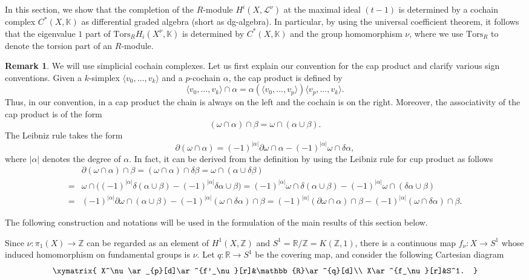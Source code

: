 \documentclass[12pt,leqno,twoside]{amsart}
\theoremstyle{plain}
\theoremstyle{definition}
\newtheorem{remark}[theorem]{Remark}
\newcommand{\R}{\mathbb{R}}
\newcommand{\Z}{\mathbb{Z}}
\newcommand{\K}{\mathbb{K}}
\newcommand{\Tors}{\mathrm{Tors}}
\newcommand{\sL}{\mathcal{L}}
\begin{document}
In this section, we show that  the completion of the $R$-module $H^i(X, \sL^\nu)$  at the maximal
ideal $(t-1)$  is determined by a cochain complex $C^*(X,\K)$ as differential graded algebra (short as dg-algebra).  In particular, by using the universal coefficient theorem, it follows that the eigenvalue $1$ part of $\Tors_R H_i(X^\nu,\K)$ is determined by $C^*(X,\K)$  and the group homomorphism $\nu$, where we use $\Tors_R$ to denote the torsion part of an $R$-module. 

\begin{remark}
We will use simplicial cochain complexes. Let us first explain our convention for the cap product and clarify various sign conventions. 
Given a $k$-simplex $\langle v_0, \ldots, v_k\rangle$ and a $p$-cochain $\alpha$, the cap product is defined by
\[
\langle v_0, \ldots, v_k\rangle\cap \alpha=\alpha(\langle v_0, \ldots, v_p\rangle) \langle v_p, \ldots, v_k\rangle.
\]
Thus, in our convention, in a cap product the chain is always on the left and the cochain is on the right. Moreover, the associativity of the cap product is of the form
\[
(\omega\cap \alpha)\cap \beta=\omega\cap(\alpha\cup \beta).
\]
The Leibniz rule takes the form 
\[
\partial(\omega\cap \alpha)=(-1)^{|\alpha|}\partial\omega\cap\alpha-(-1)^{|\alpha|}\omega\cap\delta\alpha , 
\]
where $|\alpha|$ denotes the degree of $\alpha$. In fact, it can be derived from the definition by using the Leibniz rule for cup product as follows
\begin{align*}
&\partial(\omega\cap \alpha) \cap \beta=(\omega\cap \alpha) \cap \delta\beta=\omega\cap (\alpha\cup \delta\beta)\\
=&\omega\cap\big((-1)^{|\alpha|}\delta(\alpha\cup \beta)-(-1)^{|\alpha|}\delta\alpha\cup \beta\big)=(-1)^{|\alpha|}\omega\cap \delta(\alpha\cup \beta)-(-1)^{|\alpha|}\omega\cap (\delta\alpha\cup \beta)\\
=&(-1)^{|\alpha|}\partial\omega\cap (\alpha\cup \beta)-(-1)^{|\alpha|}(\omega\cap\delta\alpha)\cap \beta=(-1)^{|\alpha|}(\partial\omega\cap\alpha)\cap \beta-(-1)^{|\alpha|}(\omega\cap\delta\alpha)\cap \beta.
\end{align*}
\end{remark}

\medskip

The following construction and notations will be used in the formulation of the main results of this section below.

Since $\nu \colon \pi_1(X)\to \Z$ can be regarded as an element of $H^1(X,\Z)$ and $S^1=\R/\Z=K(\Z,1)$, 
there is a continuous map $f_\nu\colon X\to S^1$ whose induced homomorphism on fundamental groups is $\nu$. Let $q\colon \R\to S^1$ be the covering map, and consider the following Cartesian diagram
\begin{equation}
\xymatrix{
X^\nu\ar_{p}[d]\ar^{f'_\nu}[r]&\R\ar^{q}[d]\\
X\ar^{f_\nu}[r]&S^1.
}
\end{equation}
\end{document}
